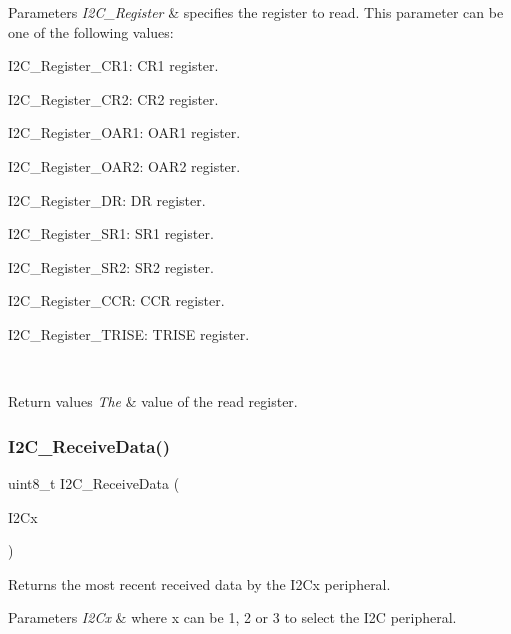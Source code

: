 \begin{DoxyParams}{Parameters}
{\em I2\+C\+\_\+\+Register} & specifies the register to read. This parameter can be one of the following values\+: \begin{DoxyItemize}
\item I2\+C\+\_\+\+Register\+\_\+\+C\+R1\+: C\+R1 register. \item I2\+C\+\_\+\+Register\+\_\+\+C\+R2\+: C\+R2 register. \item I2\+C\+\_\+\+Register\+\_\+\+O\+A\+R1\+: O\+A\+R1 register. \item I2\+C\+\_\+\+Register\+\_\+\+O\+A\+R2\+: O\+A\+R2 register. \item I2\+C\+\_\+\+Register\+\_\+\+DR\+: DR register. \item I2\+C\+\_\+\+Register\+\_\+\+S\+R1\+: S\+R1 register. \item I2\+C\+\_\+\+Register\+\_\+\+S\+R2\+: S\+R2 register. \item I2\+C\+\_\+\+Register\+\_\+\+C\+CR\+: C\+CR register. \item I2\+C\+\_\+\+Register\+\_\+\+T\+R\+I\+SE\+: T\+R\+I\+SE register. \end{DoxyItemize}
\\
\hline
\end{DoxyParams}

\begin{DoxyRetVals}{Return values}
{\em The} & value of the read register. \\
\hline
\end{DoxyRetVals}
\mbox{\label{group___i2_c_gaeaaa4b6f77f50eb57465148c55d27fb2}} 
\subsubsection{\texorpdfstring{I2\+C\+\_\+\+Receive\+Data()}{I2C\_ReceiveData()}}
{\footnotesize\ttfamily uint8\+\_\+t I2\+C\+\_\+\+Receive\+Data (\begin{DoxyParamCaption}\item[{I2\+C\+\_\+\+Type\+Def $\ast$}]{I2\+Cx }\end{DoxyParamCaption})}



Returns the most recent received data by the I2\+Cx peripheral. 


\begin{DoxyParams}{Parameters}
{\em I2\+Cx} & where x can be 1, 2 or 3 to select the I2C peripheral. \\
\hline
\end{DoxyParams}

